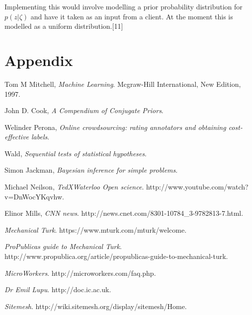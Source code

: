 \documentclass[11pt]{article}
\begin{document}
Implementing this would involve modelling a prior probability distribution for $p(z|\zeta)$ and have it taken as an input from a client. At the moment this is modelled as a uniform distribution.[11]

\section{Appendix}

\begin{thebibliography}{99}

  Tom M Mitchell,
  \emph{Machine Learning}.
  Mcgraw-Hill International,
  New Edition,
  1997.
  
  John D. Cook,
  \emph{A Compendium of Conjugate Priors}.

  Welinder Perona,
  \emph{Online crowdsourcing: rating annotators and obtaining cost-effective labels}.
  
  Wald,
  \emph{Sequential tests of statistical hypotheses}.
  
  Simon Jackman,
  \emph{Bayesian inference for simple problems}.
  
  Michael Neilson,
  \emph{TedXWaterloo Open science}.
  http://www.youtube.com/watch?v=DnWocYKqvhw.

	Elinor Mills,
	\emph{CNN news}.
	http://news.cnet.com/8301-10784\_3-9782813-7.html.   
	
	\emph{Mechanical Turk}.
	https://www.mturk.com/mturk/welcome.	
	
	
	\emph{ProPublicas guide to Mechanical Turk}.
	http://www.propublica.org/article/propublicas-guide-to-mechanical-turk.
	
	\emph{MicroWorkers}.
	http://microworkers.com/faq.php.
	
	\emph{Dr Emil Lupu}.
	http://doc.ic.ac.uk.
	
	\emph{Sitemesh}.	
	http://wiki.sitemesh.org/display/sitemesh/Home.
  

\end{thebibliography}
\end{document}
